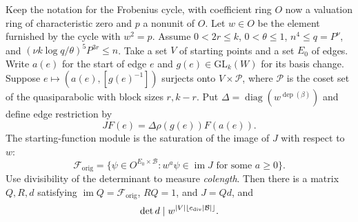 \begin{lemma}
\label{lem:a-edge-origin-basis}
\emitthmsource
Keep the notation for the Frobenius cycle, with coefficient ring $O$ now a valuation ring of characteristic zero and $p$ a nonunit of $O$. Let $w\in O$ be the element furnished by the cycle with $w^2=p$. Assume $0<2r\le k$, $0<\theta\le1$, $n^4\le q=P^\nu$, and $(\nu k\log q/\theta)^5P^{3r}\le n$. Take a set $V$ of starting points and a set $E_0$ of edges. Write $a(e)$ for the start of edge $e$ and $g(e)\in\mathrm{GL}_k(W)$ for its basis change. Suppose $e\mapsto(a(e),[g(e)^{-1}])$ surjects onto $V\times\mathcal P$, where $\mathcal P$ is the coset set of the quasiparabolic with block sizes $r,k-r$. Put $\Delta=\operatorname{diag}(w^{\operatorname{dep}(\beta)})$ and define edge restriction by
\[
 JF(e)=\Delta\rho(g(e))F(a(e)).
\]
The starting-function module is the saturation of the image of $J$ with respect to $w$:
\[
 \mathcal F_{\mathrm{orig}}
   =\{\psi\in O^{E_0\times\mathcal B}:
                          w^a\psi\in\operatorname{im}J
                          \text{ for some }a\ge0\}.
\]
Use divisibility of the determinant to measure \emph{colength}. Then there is a matrix $Q,R,d$ satisfying $\operatorname{im}Q=\mathcal F_{\mathrm{orig}}$, $RQ=1$, and $J=Qd$, and
\[
 \det d\mid w^{|V|\lfloor c_{\rm div}|\mathcal B|\rfloor}.
\]
\end{lemma}
